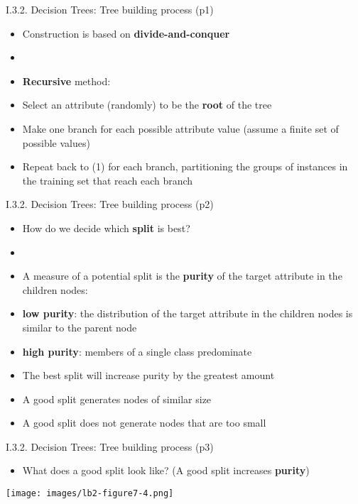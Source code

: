 \documentclass[handout]{beamer}
\newcommand{\strong}[1]{\textbf{\color{teal} #1}}
\newcommand{\stronger}[1]{\textbf{\color{purple} #1}}
\begin{document}
\begin{frame}{I.3.2. Decision Trees: Tree building process (p1)}
\begin{itemize}
\item Construction is based on \strong{divide-and-conquer}
\item[]
\item \strong{Recursive} method:
\item[(1)] Select an attribute (randomly) to be the \strong{root} of the tree
\item[(2)] Make one branch for each possible attribute value (assume a finite set of possible values)
\item[(3)] Repeat back to (1) for each branch, partitioning the groups of instances in the training set that reach each branch
\end{itemize}
\end{frame}
\begin{frame}{I.3.2. Decision Trees: Tree building process (p2)}
\begin{itemize}
\item How do we decide which \strong{split} is best?
\item[]
\item A measure of a potential split is the \stronger{purity} of the target attribute in the children nodes:
\item[--] \strong{low purity}: the distribution of the target attribute in the children nodes is similar to the parent node
\item[--] \strong{high purity}: members of a single class predominate
\item The best split will increase purity by the greatest amount
\item A good split generates nodes of similar size
\item A good split does not generate nodes that are too small
\end{itemize}
\end{frame}
\begin{frame}{I.3.2. Decision Trees: Tree building process (p3)}
\begin{itemize}
\item[] What does a good split look like? (A good split increases \strong{purity})
\end{itemize}
\begin{center}
\texttt{[image: images/lb2-figure7-4.png]}\\
\cite[ch7]{LB2:2004}
\end{center}
\end{frame}
\end{document}
